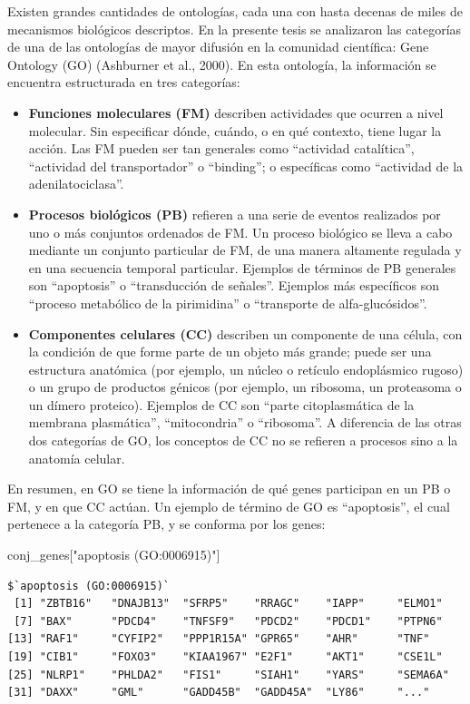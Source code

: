 \documentclass[12pt,twoside]{reedthesis}
\newenvironment{Shaded}{\begin{snugshade}}{\end{snugshade}}
\newcommand{\NormalTok}[1]{#1}
\newcommand{\StringTok}[1]{\textcolor[rgb]{0.31,0.60,0.02}{#1}}
\begin{document}
Existen grandes cantidades de ontologías, cada una con hasta decenas de miles de mecanismos biológicos descriptos. En la presente tesis se analizaron las categorías de una de las ontologías de mayor difusión en la comunidad científica: Gene Ontology (GO) (Ashburner et al., 2000). En esta ontología, la información se encuentra estructurada en tres categorías:
\begin{itemize}
\item
  \textbf{Funciones moleculares (FM)} describen actividades que ocurren a nivel molecular. Sin especificar dónde, cuándo, o en qué contexto, tiene lugar la acción. Las FM pueden ser tan generales como ``actividad catalítica'', ``actividad del transportador'' o ``binding''; o específicas como ``actividad de la adenilatociclasa''.
\item
  \textbf{Procesos biológicos (PB)} refieren a una serie de eventos realizados por uno o más conjuntos ordenados de FM. Un proceso biológico se lleva a cabo mediante un conjunto particular de FM, de una manera altamente regulada y en una secuencia temporal particular. Ejemplos de términos de PB generales son ``apoptosis'' o ``transducción de señales''. Ejemplos más específicos son ``proceso metabólico de la pirimidina'' o ``transporte de alfa-glucósidos''.
\item
  \textbf{Componentes celulares (CC)} describen un componente de una célula, con la condición de que forme parte de un objeto más grande; puede ser una estructura anatómica (por ejemplo, un núcleo o retículo endoplásmico rugoso) o un grupo de productos génicos (por ejemplo, un ribosoma, un proteasoma o un dímero proteico). Ejemplos de CC son ``parte citoplasmática de la membrana plasmática'', ``mitocondria'' o ``ribosoma''. A diferencia de las otras dos categorías de GO, los conceptos de CC no se refieren a procesos sino a la anatomía celular.
\end{itemize}
En resumen, en GO se tiene la información de qué genes participan en un PB o FM, y en que CC actúan. Un ejemplo de término de GO es ``apoptosis'', el cual pertenece a la categoría PB, y se conforma por los genes:
\begin{Shaded}
\begin{Highlighting}[]
\NormalTok{conj_genes[}\StringTok{"apoptosis (GO:0006915)"}\NormalTok{]}
\end{Highlighting}
\end{Shaded}
\begin{verbatim}
$`apoptosis (GO:0006915)`
 [1] "ZBTB16"   "DNAJB13"  "SFRP5"    "RRAGC"    "IAPP"     "ELMO1"   
 [7] "BAX"      "PDCD4"    "TNFSF9"   "PDCD2"    "PDCD1"    "PTPN6"   
[13] "RAF1"     "CYFIP2"   "PPP1R15A" "GPR65"    "AHR"      "TNF"     
[19] "CIB1"     "FOXO3"    "KIAA1967" "E2F1"     "AKT1"     "CSE1L"   
[25] "NLRP1"    "PHLDA2"   "FIS1"     "SIAH1"    "YARS"     "SEMA6A"  
[31] "DAXX"     "GML"      "GADD45B"  "GADD45A"  "LY86"     "..."     
\end{verbatim}
\end{document}
